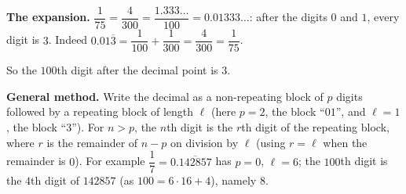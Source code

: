 \textbf{The expansion.} $\dfrac{1}{75}=\dfrac{4}{300}=\dfrac{1.333\ldots}{100}=0.01333\ldots$: after the digits $0$ and $1$, every digit is $3$. Indeed $0.01\overline{3}=\dfrac{1}{100}+\dfrac{1}{300}=\dfrac{4}{300}=\dfrac{1}{75}$.

So the $100$th digit after the decimal point is $\boxed{3}$.

\textbf{General method.} Write the decimal as a non-repeating block of $p$ digits followed by a repeating block of length $\ell$ (here $p=2$, the block ``$01$'', and $\ell=1$, the block ``$3$''). For $n>p$, the $n$th digit is the $r$th digit of the repeating block, where $r$ is the remainder of $n-p$ on division by $\ell$ (using $r=\ell$ when the remainder is $0$). For example $\dfrac{1}{7}=0.\overline{142857}$ has $p=0$, $\ell=6$; the $100$th digit is the $4$th digit of $142857$ (as $100=6\cdot16+4$), namely $8$.
